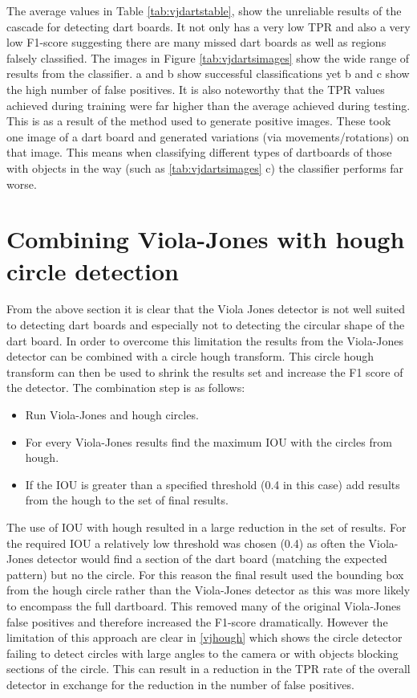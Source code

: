 \documentclass{article}
\begin{document}
\begin{multicols}{2}
The average values in Table \ref{tab:vjdartstable}, show the unreliable results of
the cascade for detecting dart boards.  It not only has a very low TPR and also
a very low F1-score suggesting there are many missed dart boards as well as
regions falsely classified. The images in Figure \ref{tab:vjdartsimages} show
the wide range of results from the classifier. a and b show successful
classifications yet b and c show the high number of false positives. It is also
noteworthy that the TPR values achieved during training were far higher than
the average achieved during testing. This is as a result of the method used to
generate positive images. These took one image of a dart board and generated
variations (via movements/rotations) on that image. This means when classifying
different types of dartboards of those with objects in the way (such as
\ref{tab:vjdartsimages} c) the classifier performs far worse.

\section{Combining Viola-Jones with hough circle detection}

From the above section it is clear that the Viola Jones detector is not well
suited to detecting dart boards and especially not to detecting the circular
shape of the dart board. In order to overcome this limitation the results from
the Viola-Jones detector can be combined with a circle hough transform. This
circle hough transform can then be used to shrink the results set and increase
the F1 score of the detector. The combination step is as follows:

\begin{itemize}
  \item Run Viola-Jones and hough circles.
  \item For every Viola-Jones results find the maximum IOU with the circles
    from hough. 
  \item If the IOU is greater than a specified threshold (0.4 in this case)
    add results from the hough to the set of final results. 
\end{itemize} 

The use of IOU with hough resulted in a large reduction in the set of results.
For the required IOU a relatively low threshold was chosen (0.4) as often the
Viola-Jones detector would find a section of the dart board (matching the
expected pattern) but no the circle. For this reason the final result used the
bounding box from the hough circle rather than the Viola-Jones detector as this
was more likely to encompass the full dartboard. This removed many of the
original Viola-Jones false positives and therefore increased the F1-score
dramatically.  However the limitation of this approach are clear in
\ref{vjhough} which shows the circle detector failing to detect circles with
large angles to the camera or with objects blocking sections of the circle.
This can result in a reduction in the TPR rate of the overall detector in
exchange for the reduction in the number of false positives.


\end{multicols}
\end{document}
